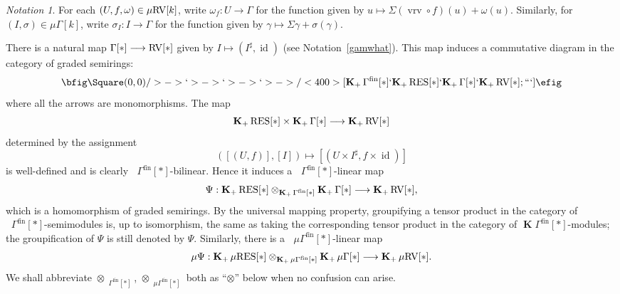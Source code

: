 \documentclass[12pt]{amsart}
\theoremstyle{plain}
\theoremstyle{definition}
\newtheorem{defn}[thm]{Definition}
\theoremstyle{remark}
\newtheorem{nota}[thm]{Notation}
\numberwithin{equation}{section}
\theoremstyle{plain}
\newcommand{\RV}{\textup{RV}}
\DeclareMathOperator{\id}{id}
\newcommand{\0}{\emptyset}
\newcommand{\fun}{\longrightarrow}
\newcommand{\efun}{\longmapsto}
\newcommand{\mgRV}{{\mu}{\RV}}
\newcommand{\mG}{{\mu}{\Gamma}}
\newcommand{\RES}{\textup{RES}}
\newcommand{\mgRES}{{\mu}{\RES}}
\DeclareMathOperator{\gsk}{\mathbf{K}_+}
\DeclareMathOperator{\ggk}{\mathbf{K}}
\DeclareMathOperator{\fin}{fin}
\DeclareMathOperator{\vrv}{vrv}
\begin{document}
\begin{nota}\label{comp:form}
For each $(U, f, \omega) \in \mgRV[k]$, write $\omega_f : U \fun \Gamma$ for the function given by $u \efun \Sigma(\vrv \circ f)(u) + \omega(u)$. Similarly, for $(I, \sigma) \in \mG[k]$, write $\sigma_I : I \fun \Gamma$ for the function given by $\gamma \efun \Sigma \gamma + \sigma(\gamma)$.
\end{nota}

%

There is a natural map $\Gamma[*] \fun \RV[*]$ given by $I \efun (I^\sharp, \id)$ (see Notation~\ref{gamwhat}). This map induces a commutative diagram in the category of graded semirings:
\[
\bfig
 \Square(0,0)/>->`>->`>->`>->/<400>[{\gsk \Gamma^{\fin}[*]}`{\gsk \RES[*]}`{\gsk \Gamma[*]}`{\gsk \RV[*]}; ```]
\efig
\]
where all the arrows are monomorphisms. The map
\[
\gsk \RES[*] \times \gsk \Gamma[*] \fun \gsk \RV[*]
\]
determined by the assignment
\begin{equation}\label{bil:def}
([(U, f)], [I]) \efun [(U \times I^\sharp, f \times \id)]
\end{equation}
is well-defined and is clearly $\gsk \Gamma^{\fin}[*]$-bilinear. Hence it induces a $\gsk \Gamma^{\fin}[*]$-linear map
\begin{equation}\label{tensor:expre}
\Psi: \gsk \RES[*] \otimes_{\gsk \Gamma^{\fin}[*]} \gsk \Gamma[*] \fun \gsk \RV[*],
\end{equation}
which is a homomorphism of graded semirings. By the universal mapping property, groupifying a tensor product in the category of $\gsk \Gamma^{\fin}[*]$-semimodules is, up to isomorphism, the same as taking the corresponding tensor product in the category of $\ggk \Gamma^{\fin}[*]$-modules; the groupification of $\Psi$ is still denoted by $\Psi$. Similarly, there is a
$\gsk \mG^{\fin}[*]$-linear map
\begin{equation}\label{bdd:to:2bdd}
{\mu}\Psi: \gsk \mgRES[*] \otimes_{\gsk \mG^{\fin}[*]} \gsk \mG[*] \fun \gsk \mgRV[*].
\end{equation}
We shall abbreviate $\otimes_{\gsk \Gamma^{\fin}[*]}$, $\otimes_{\gsk \mG^{\fin}[*]}$ both as ``$\otimes$'' below when no confusion can arise.
\end{document}
